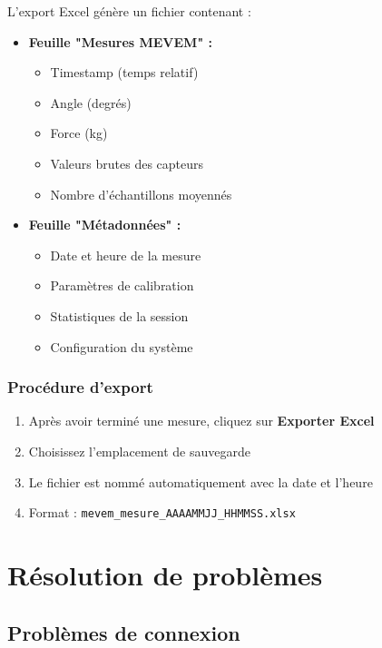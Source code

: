 \documentclass[12pt,a4paper]{article}
\begin{document}
L'export Excel génère un fichier contenant :

\begin{itemize}
    \item \textbf{Feuille "Mesures MEVEM" :}
    \begin{itemize}
        \item Timestamp (temps relatif)
        \item Angle (degrés)
        \item Force (kg)
        \item Valeurs brutes des capteurs
        \item Nombre d'échantillons moyennés
    \end{itemize}
    
    \item \textbf{Feuille "Métadonnées" :}
    \begin{itemize}
        \item Date et heure de la mesure
        \item Paramètres de calibration
        \item Statistiques de la session
        \item Configuration du système
    \end{itemize}
\end{itemize}

\subsubsection{Procédure d'export}

\begin{enumerate}
    \item Après avoir terminé une mesure, cliquez sur \textbf{Exporter Excel}
    \item Choisissez l'emplacement de sauvegarde
    \item Le fichier est nommé automatiquement avec la date et l'heure
    \item Format : \texttt{mevem\_mesure\_AAAAMMJJ\_HHMMSS.xlsx}
\end{enumerate}

\section{Résolution de problèmes}

\subsection{Problèmes de connexion}
\end{document}
